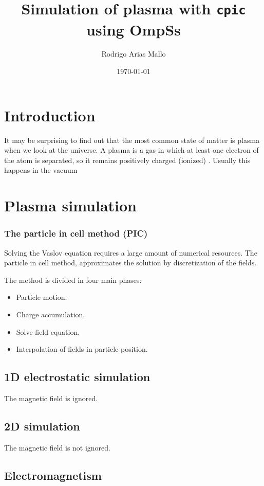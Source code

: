 \documentclass[a5paper,12pt,landscape]{report}
\title{Simulation of plasma with \texttt{cpic} using OmpSs}
\author{Rodrigo Arias Mallo}
\date{\today}
\begin{document}
\maketitle
\tableofcontents

\chapter{Introduction}

It may be surprising to find out that the most common state of matter is plasma 
when we look at the universe. A plasma is a gas in which at least one electron 
of the atom is separated, so it remains positively charged (ionized) 
\cite{chen}.  Usually this happens in the vacuum

\chapter{Plasma simulation}


\subsection{The particle in cell method (PIC)}

Solving the Vaslov equation requires a large amount of numerical resources. The 
particle in cell method, approximates the solution by discretization of the 
fields.

The method is divided in four main phases: 

\begin{itemize}
\item Particle motion.
\item Charge accumulation.
\item Solve field equation.
\item Interpolation of fields in particle position.
\end{itemize}


\section{1D electrostatic simulation}
The magnetic field is ignored.

\section{2D simulation}
The magnetic field is not ignored.

\section{Electromagnetism}
\end{document}
